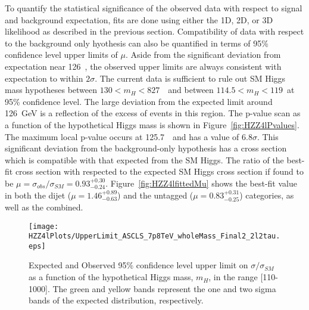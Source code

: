 To quantify the statistical significance of the observed data
with respect to signal and background expectation, 
fits are done using either the 1D, 2D, or 3D likelihood as 
described in the previous section.  
Compatibility of data with respect to the background only
hyothesis can also be quantified in terms of 95\% confidence
level upper limits of $\mu$.  
Aside from the significant deviation
from expectation near 126~\GeV, the observed upper limits are 
always consistent with expectation to within $2\sigma$.  The
current data is sufficient to rule out SM Higgs mass hypotheses
between $130<m_{H}<827$~\GeV~and between $114.5<m_{H}<119$~at 
95\% confidence level.
The large deviation from the expected limit around 126~GeV is 
a reflection of the excess of events in this region.  
The p-value scan as a function of the hypothetical Higgs mass
is shown in Figure~\ref{fig:HZZ4lPvalues}.  The maximum local 
p-value 
occurs at 125.7~\GeV~and has a value of $6.8\sigma$.  This 
significant deviation from the background-only hypothesis has 
a cross section which is compatible 
with that expected from the SM Higgs.  The ratio of the best-fit
cross section with respected to the expected SM Higgs cross
section if found to be $\mu=\sigma_{obs}/\sigma_{SM}=0.93^{+0.30}_{-0.24}$.  Figure~\ref{fig:HZZ4lfittedMu} shows the best-fit value
in both the dijet ($\mu=1.46^{+0.89}_{-0.63}$) and the untagged ($\mu=0.83^{+0.31}_{-0.25}$) categories, as well as the combined.

\begin{figure}
\begin{center}
\texttt{[image: HZZ4lPlots/UpperLimit\_ASCLS\_7p8TeV\_wholeMass\_Final2\_2l2tau.eps]}
\caption{Expected and Observed 95\% confidence level upper limit on
$\sigma/\sigma_{SM}$ as a function of the hypothetical 
Higgs mass, $m_H$, in the range [110-1000].
The green and yellow bands represent
the one and two sigma bands of the expected distribution, 
respectively.}
\label{fig:HZZ4lUpperLimits}
\end{center}
\end{figure}

